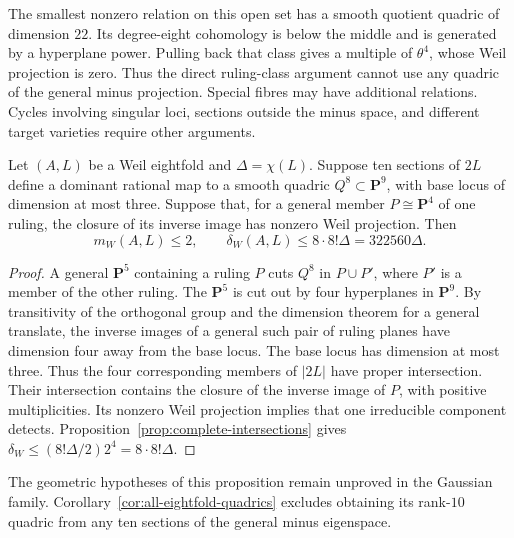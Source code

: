 The smallest nonzero relation on this open set has a smooth
quotient quadric of dimension $22$. Its degree-eight cohomology
is below the middle and is generated by a hyperplane power.
Pulling back that class gives a multiple of $\theta^4$, whose
Weil projection is zero. Thus the direct ruling-class argument
cannot use any quadric of the general minus projection.
Special fibres may have additional relations. Cycles involving
singular loci, sections outside the minus space, and different
target varieties require other arguments.

\begin{proposition}\label{prop:quadric-gate}
Let $(A,L)$ be a Weil eightfold and $\Delta=\chi(L)$. Suppose ten sections of $2L$ define a dominant rational map to a smooth quadric $Q^8\subset\mathbf P^9$, with base locus of dimension at most three. Suppose that, for a general member $P\cong\mathbf P^4$ of one ruling, the closure of its inverse image has nonzero Weil projection. Then
\[
 m_W(A,L)\le2,\qquad \delta_W(A,L)\le8\cdot8!\Delta=322560\Delta.
\]
\end{proposition}

\begin{proof}
A general $\mathbf P^5$ containing a ruling $P$ cuts $Q^8$ in $P\cup P'$, where $P'$ is a member of the other ruling. The $\mathbf P^5$ is cut out by four hyperplanes in $\mathbf P^9$. By transitivity of the orthogonal group and the dimension theorem for a general translate, the inverse images of a general such pair of ruling planes have dimension four away from the base locus. The base locus has dimension at most three. Thus the four corresponding members of $|2L|$ have proper intersection. Their intersection contains the closure of the inverse image of $P$, with positive multiplicities. Its nonzero Weil projection implies that one irreducible component detects. Proposition~\ref{prop:complete-intersections} gives
$\delta_W\le(8!\Delta/2)2^4=8\cdot8!\Delta$.
\end{proof}

The geometric hypotheses of this proposition remain unproved in
the Gaussian family. Corollary~\ref{cor:all-eightfold-quadrics}
excludes obtaining its rank-$10$ quadric from any ten sections
of the general minus eigenspace.
